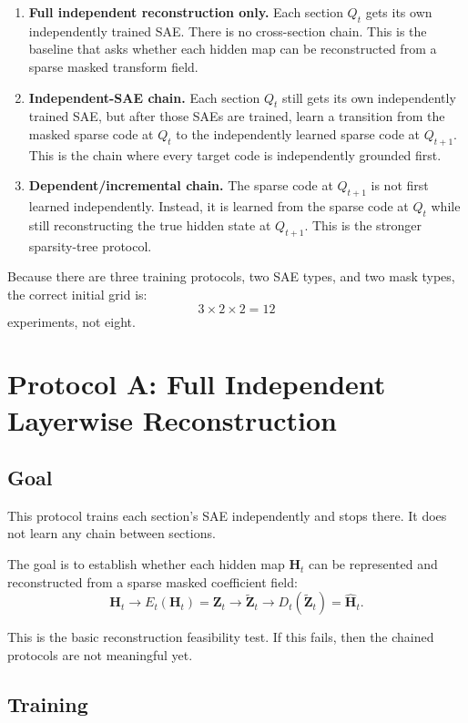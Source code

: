 \documentclass[11pt]{article}
\newcommand{\Htens}{\mathbf{H}}
\newcommand{\Ztens}{\mathbf{Z}}
\newcommand{\Hhat}{\widehat{\mathbf{H}}}
\newcommand{\Ztilde}{\widetilde{\mathbf{Z}}}
\begin{document}
\begin{enumerate}[leftmargin=*]
    \item \textbf{Full independent reconstruction only.} Each section \(Q_t\) gets its own independently trained SAE. There is no cross-section chain. This is the baseline that asks whether each hidden map can be reconstructed from a sparse masked transform field.
    \item \textbf{Independent-SAE chain.} Each section \(Q_t\) still gets its own independently trained SAE, but after those SAEs are trained, learn a transition from the masked sparse code at \(Q_t\) to the independently learned sparse code at \(Q_{t+1}\). This is the chain where every target code is independently grounded first.
    \item \textbf{Dependent/incremental chain.} The sparse code at \(Q_{t+1}\) is not first learned independently. Instead, it is learned from the sparse code at \(Q_t\) while still reconstructing the true hidden state at \(Q_{t+1}\). This is the stronger sparsity-tree protocol.
\end{enumerate}

Because there are three training protocols, two SAE types, and two mask types, the correct initial grid is:
\[
3 \times 2 \times 2 = 12
\]
experiments, not eight.

\section{Protocol A: Full Independent Layerwise Reconstruction}

\subsection{Goal}

This protocol trains each section's SAE independently and stops there. It does not learn any chain between sections.

The goal is to establish whether each hidden map \(\Htens_t\) can be represented and reconstructed from a sparse masked coefficient field:
\[
\Htens_t
\rightarrow
E_t(\Htens_t)=\Ztens_t
\rightarrow
\Ztilde_t
\rightarrow
D_t(\Ztilde_t)=\Hhat_t.
\]

This is the basic reconstruction feasibility test. If this fails, then the chained protocols are not meaningful yet.

\subsection{Training}
\end{document}
